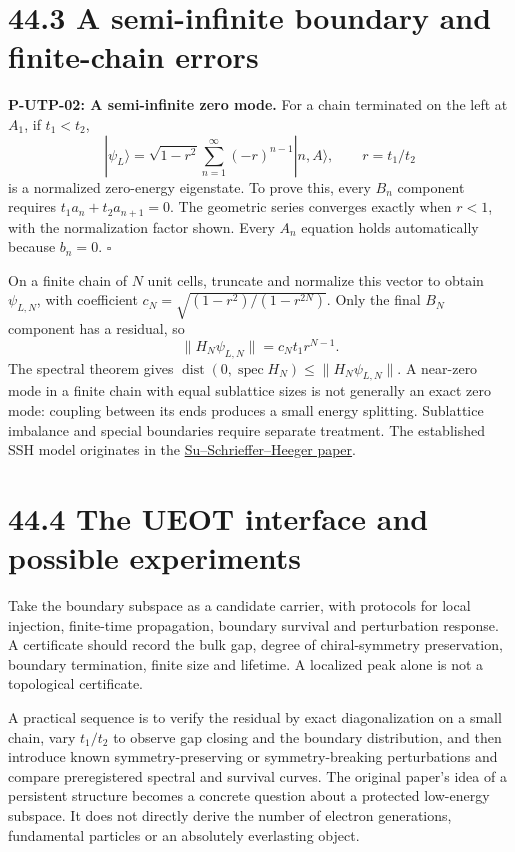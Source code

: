 \documentclass[
  11pt,
  oneside]{book}
\begin{document}
\section{44.3 A semi-infinite boundary and finite-chain errors}

\label{p-utp-02}{}

\textbf{P-UTP-02: A semi-infinite zero mode.} For a chain terminated on
the left at \(A_1\), if \(t_1<t_2\), \[
|\psi_L\rangle=\sqrt{1-r^2}\sum_{n=1}^\infty(-r)^{n-1}|n,A\rangle,
\qquad r=t_1/t_2
\] is a normalized zero-energy eigenstate. To prove this, every \(B_n\)
component requires \(t_1a_n+t_2a_{n+1}=0\). The geometric series
converges exactly when \(r<1\), with the normalization factor shown.
Every \(A_n\) equation holds automatically because \(b_n=0\).
\(\square\)

On a finite chain of \(N\) unit cells, truncate and normalize this
vector to obtain \(\psi_{L,N}\), with coefficient
\(c_N=\sqrt{(1-r^2)/(1-r^{2N})}\). Only the final \(B_N\) component has
a residual, so \[
\|H_N\psi_{L,N}\|=c_Nt_1r^{N-1}.
\] The spectral theorem gives
\(\operatorname{dist}(0,\operatorname{spec}H_N)\le\|H_N\psi_{L,N}\|\). A
near-zero mode in a finite chain with equal sublattice sizes is not
generally an exact zero mode: coupling between its ends produces a small
energy splitting. Sublattice imbalance and special boundaries require
separate treatment. The established SSH model originates in the
\href{https://link.aps.org/doi/10.1103/PhysRevLett.42.1698}{Su--Schrieffer--Heeger
paper}.

\section{44.4 The UEOT interface and possible experiments}

Take the boundary subspace as a candidate carrier, with protocols for
local injection, finite-time propagation, boundary survival and
perturbation response. A certificate should record the bulk gap, degree
of chiral-symmetry preservation, boundary termination, finite size and
lifetime. A localized peak alone is not a topological certificate.

A practical sequence is to verify the residual by exact diagonalization
on a small chain, vary \(t_1/t_2\) to observe gap closing and the
boundary distribution, and then introduce known symmetry-preserving or
symmetry-breaking perturbations and compare preregistered spectral and
survival curves. The original paper's idea of a persistent structure
becomes a concrete question about a protected low-energy subspace. It
does not directly derive the number of electron generations, fundamental
particles or an absolutely everlasting object.
\end{document}

